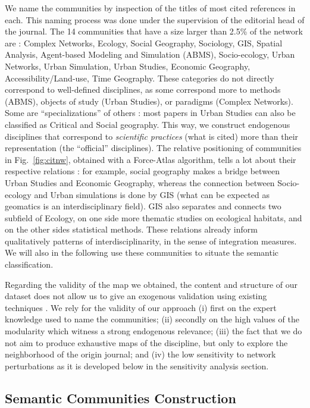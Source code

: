 \documentclass[10pt]{article}
\begin{document}
We name the communities by inspection of the titles of most cited references in each. This naming process was done under the supervision of the editorial head of the journal. The 14 communities that have a size larger than 2.5\% of the network are : Complex Networks, Ecology, Social Geography, Sociology, GIS, Spatial Analysis, Agent-based Modeling and Simulation (ABMS), Socio-ecology, Urban Networks, Urban Simulation, Urban Studies, Economic Geography, Accessibility/Land-use, Time Geography. These categories do not directly correspond to well-defined disciplines, as some correspond more to methods (ABMS), objects of study (Urban Studies), or paradigms (Complex Networks). Some are ``specializations'' of others : most papers in Urban Studies can also be classified as Critical and Social geography. This way, we construct endogenous disciplines that correspond to \emph{scientific practices} (what is cited) more than their representation (the ``official'' disciplines). The relative positioning of communities in Fig.~\ref{fig:citnw}, obtained with a Force-Atlas algorithm, tells a lot about their respective relations : for example, social geography makes a bridge between Urban Studies and Economic Geography, whereas the connection between Socio-ecology and Urban simulations is done by GIS (what can be expected as geomatics is an interdisciplinary field). GIS also separates and connects two subfield of Ecology, on one side more thematic studies on ecological habitats, and on the other sides statistical methods. These relations already inform qualitatively patterns of interdisciplinarity, in the sense of integration measures. We will also in the following use these communities to situate the semantic classification.

Regarding the validity of the map we obtained, the content and structure of our dataset does not allow us to give an exogenous validation using existing techniques \cite{boyack2005mapping}. We rely for the validity of our approach (i) first on the expert knowledge used to name the communities; (ii) secondly on the high values of the modularity which witness a strong endogenous relevance; (iii) the fact that we do not aim to produce exhaustive maps of the discipline, but only to explore the neighborhood of the origin journal; and (iv) the low sensitivity to network perturbations as it is developed below in the sensitivity analysis section.



\subsection*{Semantic Communities Construction}
\end{document}

